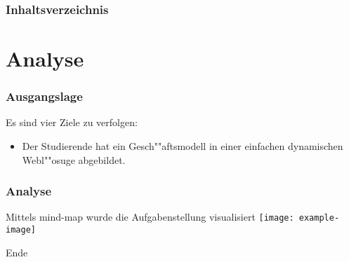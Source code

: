 \documentclass{beamer}
\begin{document}
\begin{frame}
    \frametitle{Inhaltsverzeichnis}
    \tableofcontents
    \note{~}
\end{frame}

\section{Analyse}

\begin{frame}
    \frametitle{Ausgangslage}
    Es sind vier Ziele zu verfolgen:
    \begin{itemize}
        \item Der Studierende hat ein Gesch""aftsmodell in einer einfachen dynamischen Webl""osuge abgebildet.
    \end{itemize}
\end{frame}

\begin{frame}
    \frametitle{Analyse}
    Mittels mind-map wurde die Aufgabenstellung visualisiert
    \texttt{[image: example-image]}
\end{frame}

\begin{frame}
    Ende
\end{frame}
\end{document}
